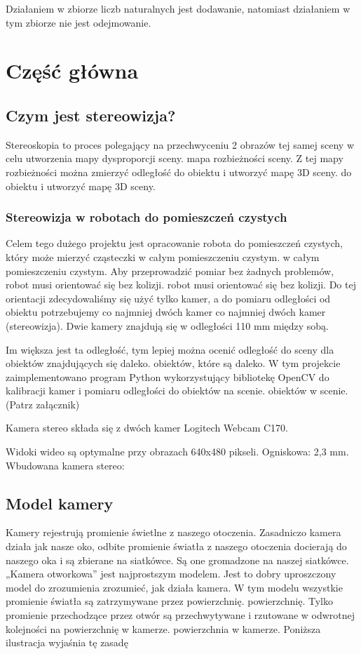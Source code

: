 \documentclass[magisterska]{pracadypl}
\begin{document}
  Działaniem w zbiorze liczb naturalnych jest dodawanie, natomiast działaniem w tym zbiorze nie jest odejmowanie.


\chapter{Część główna}

\section{Czym jest stereowizja?}

Stereoskopia to proces polegający na przechwyceniu 2 obrazów tej samej sceny w celu utworzenia mapy dysproporcji sceny.
mapa rozbieżności sceny. Z tej mapy rozbieżności można zmierzyć odległość do obiektu i utworzyć mapę 3D sceny.
do obiektu i utworzyć mapę 3D sceny.

\subsection{Stereowizja w robotach do pomieszczeń czystych}

Celem tego dużego projektu jest opracowanie robota do pomieszczeń czystych, który może mierzyć cząsteczki w całym pomieszczeniu czystym.
w całym pomieszczeniu czystym. Aby przeprowadzić pomiar bez żadnych problemów, robot musi orientować się bez kolizji.
robot musi orientować się bez kolizji. Do tej orientacji zdecydowaliśmy się użyć tylko
kamer, a do pomiaru odległości od obiektu potrzebujemy co najmniej dwóch kamer
co najmniej dwóch kamer (stereowizja). Dwie kamery znajdują się w odległości 110
mm między sobą.

Im większa jest ta odległość, tym lepiej można ocenić odległość do sceny dla obiektów znajdujących się daleko.
obiektów, które są daleko.
W tym projekcie zaimplementowano program Python wykorzystujący bibliotekę OpenCV
do kalibracji kamer i pomiaru odległości do obiektów na scenie.
obiektów w scenie. (Patrz załącznik)

Kamera stereo składa się z dwóch kamer Logitech Webcam C170.

Widoki wideo są optymalne przy obrazach 640x480 pikseli. Ogniskowa: 2,3 mm.
Wbudowana kamera stereo:

\section{Model kamery}

Kamery rejestrują promienie świetlne z naszego otoczenia. Zasadniczo kamera działa jak
nasze oko, odbite promienie światła z naszego otoczenia docierają do naszego oka i są zbierane na siatkówce.
Są one gromadzone na naszej siatkówce.
„Kamera otworkowa” jest najprostszym modelem. Jest to dobry uproszczony model do zrozumienia
zrozumieć, jak działa kamera. W tym modelu wszystkie promienie światła są zatrzymywane przez powierzchnię.
powierzchnię. Tylko promienie przechodzące przez otwór są przechwytywane i rzutowane w odwrotnej kolejności na powierzchnię w kamerze.
powierzchnia w kamerze. Poniższa ilustracja wyjaśnia tę zasadę
\end{document}
